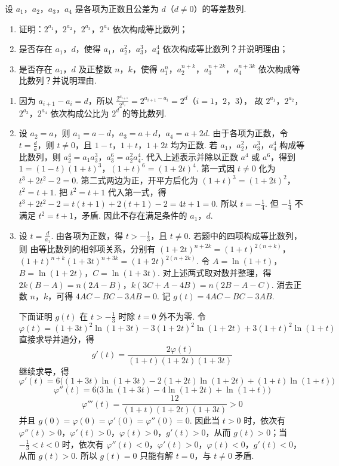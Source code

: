\begin{problem}
设 \(a_1\)，\(a_2\)，\(a_3\)，\(a_4\) 是各项为正数且公差为 \(d\)（\(d \neq 0\)）的等差数列.
\begin{enumerate}
\item 证明：\(2^{a_1}\)，\(2^{a_2}\)，\(2^{a_3}\)，\(2^{a_4}\) 依次构成等比数列；
\item 是否存在 \(a_1\)，\(d\)，使得 \(a_1\)，\(a_2^{2}\)，\(a_3^{3}\)，\(a_4^{4}\) 依次构成等比数列？并说明理由；
\item 是否存在 \(a_1\)，\(d\) 及正整数 \(n\)，\(k\)，使得 \(a_1^{n}\)，\(a_2^{n+k}\)，\(a_3^{n+2k}\)，\(a_4^{n+3k}\) 依次构成等比数列？并说明理由.
\end{enumerate}
\end{problem}

\begin{solution}
\begin{enumerate}
\item 因为 \(a_{i+1}-a_i=d\)，所以 \(\frac{2^{a_{i+1}}}{2^{a_i}}=2^{a_{i+1}-a_i}=2^{d}\)（\(i=1\)，\(2\)，\(3\)），
故 \(2^{a_1}\)，\(2^{a_2}\)，\(2^{a_3}\)，\(2^{a_4}\) 依次构成公比为 \(2^d\) 的等比数列.

\item 设 \(a_2=a\)，则 \(a_1=a-d\)，\(a_3=a+d\)，\(a_4=a+2d\).
由于各项为正数，令 \(t=\frac da\)，则 \(t\neq0\)，且 \(1-t\)，\(1+t\)，\(1+2t\) 均为正数. 若 \(a_1\)，\(a_2^2\)，\(a_3^3\)，\(a_4^4\) 构成等比数列，则 \(a_2^4=a_1a_3^3\)，\(a_3^6=a_2^2a_4^4\). 代入上述表示并除以正数 \(a^4\) 或 \(a^6\)，得到 \(1=(1-t)(1+t)^3\)，\((1+t)^6=(1+2t)^4\). 第一式因 \(t\neq0\) 化为 \(t^3+2t^2-2=0\). 第二式两边为正，开平方后化为 \((1+t)^3=(1+2t)^2\)，\(t^2=t+1\). 把 \(t^2=t+1\) 代入第一式，得 \(t^3+2t^2-2=t(t+1)+2(t+1)-2=4t+1=0\).
所以 \(t=-\frac14\). 但 \(-\frac14\) 不满足 \(t^2=t+1\)，矛盾. 因此不存在满足条件的 \(a_1\)，\(d\).

\item 设 \(t=\frac d{a_1}\). 由各项为正数，得 \(t>-\frac13\)，且 \(t\neq0\). 若题中的四项构成等比数列，则
由等比数列的相邻项关系，分别有 \((1+2t)^{n+2k}=(1+t)^{2(n+k)}\)，\((1+t)^{n+k}(1+3t)^{n+3k}=(1+2t)^{2(n+2k)}\).
令
\(A=\ln(1+t)\)，\(B=\ln(1+2t)\)，\(C=\ln(1+3t)\).
对上述两式取对数并整理，得 \(2k(B-A)=n(2A-B)\)，\(k(3C+A-4B)=n(2B-A-C)\). 消去正数 \(n\)，\(k\)，可得 \(4AC-BC-3AB=0\). 记 \(g(t)=4AC-BC-3AB\).

下面证明 \(g(t)\) 在 \(t>-\frac13\) 时除 \(t=0\) 外不为零. 令
\[
\varphi(t)=(1+3t)^2\ln(1+3t)-3(1+2t)^2\ln(1+2t)+3(1+t)^2\ln(1+t)
\]
直接求导并通分，得
\[
g'(t)=\frac{2\varphi(t)}{(1+t)(1+2t)(1+3t)}
\]
继续求导，得
\[
\varphi'(t)=6\bigl((1+3t)\ln(1+3t)-2(1+2t)\ln(1+2t)+(1+t)\ln(1+t)\bigr)
\]
\[
\varphi''(t)=6\bigl(3\ln(1+3t)-4\ln(1+2t)+\ln(1+t)\bigr)
\]
\[
\varphi'''(t)=\frac{12}{(1+t)(1+2t)(1+3t)}>0
\]
并且 \(g(0)=\varphi(0)=\varphi'(0)=\varphi''(0)=0\). 因此当 \(t>0\) 时，依次有 \(\varphi''(t)>0\)，\(\varphi'(t)>0\)，\(\varphi(t)>0\)，\(g'(t)>0\)，从而 \(g(t)>0\)；当 \(-\frac13<t<0\) 时，依次有 \(\varphi''(t)<0\)，\(\varphi'(t)>0\)，\(\varphi(t)<0\)，\(g'(t)<0\)，从而 \(g(t)>0\). 所以 \(g(t)=0\) 只能有解 \(t=0\)，与 \(t\neq0\) 矛盾.


\end{enumerate}
\end{solution}
